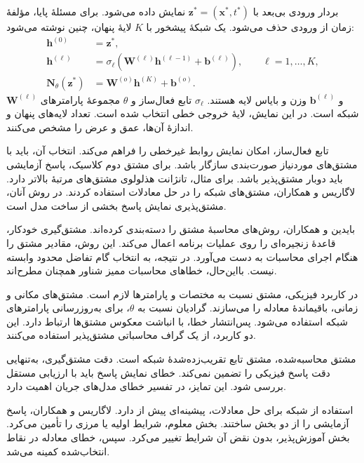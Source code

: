 بردار ورودی بی‌بعد با $\mathbf z^*=(\mathbf x^*,t^*)$ نمایش داده می‌شود.
برای مسئلهٔ پایا، مؤلفهٔ زمان از ورودی حذف می‌شود.
یک شبکهٔ پیشخور با $K$ لایهٔ پنهان، چنین نوشته می‌شود:
\begin{equation}
\begin{aligned}
\mathbf h^{(0)}&=\mathbf z^*,\\
\mathbf h^{(\ell)}
&=\sigma_\ell\!\left(
\mathbf W^{(\ell)}\mathbf h^{(\ell-1)}+\mathbf b^{(\ell)}
\right),\qquad \ell=1,\ldots,K,\\
\mathbf N_\theta(\mathbf z^*)
&=\mathbf W^{(o)}\mathbf h^{(K)}+\mathbf b^{(o)}.
\end{aligned}
\label{eq:lit-feedforward-network}
\end{equation}
$\mathbf W^{(\ell)}$ و $\mathbf b^{(\ell)}$ وزن و بایاس لایه هستند.
$\sigma_\ell$ تابع فعال‌ساز و $\theta$ مجموعهٔ پارامترهای شبکه است.
در این نمایش، لایهٔ خروجی خطی انتخاب شده است.
تعداد لایه‌های پنهان و اندازهٔ آن‌ها، عمق و عرض را مشخص می‌کنند.
\cite{Goodfellow2016}

تابع فعال‌ساز، امکان نمایش روابط غیرخطی را فراهم می‌کند.
انتخاب آن، باید با مشتق‌های موردنیاز صورت‌بندی سازگار باشد.
برای مشتق دوم کلاسیک، پاسخ آزمایشی باید دوبار مشتق‌پذیر باشد.
برای مثال، تانژانت هذلولوی مشتق‌های مرتبهٔ بالاتر دارد.
لاگاریس و همکاران، مشتق‌های شبکه را در حل معادلات استفاده کردند.
در روش آنان، مشتق‌پذیری نمایش پاسخ بخشی از ساخت مدل است.
\cite{Lagaris1998}

بایدین و همکاران، روش‌های محاسبهٔ مشتق را دسته‌بندی کرده‌اند.
مشتق‌گیری خودکار، قاعدهٔ زنجیره‌ای را روی عملیات برنامه اعمال می‌کند.
این روش، مقادیر مشتق را هنگام اجرای محاسبات به دست می‌آورد.
در نتیجه، به انتخاب گام تفاضل محدود وابسته نیست.
بااین‌حال، خطاهای محاسبات ممیز شناور همچنان مطرح‌اند.
\cite{Baydin2018}

در کاربرد فیزیکی، مشتق نسبت به مختصات و پارامترها لازم است.
مشتق‌های مکانی و زمانی، باقیماندهٔ معادله را می‌سازند.
گرادیان نسبت به $\theta$، برای به‌روزرسانی پارامترهای شبکه استفاده می‌شود.
پس‌انتشار خطا، با انباشت معکوس مشتق‌ها ارتباط دارد.
این دو کاربرد، از یک گراف محاسباتی مشتق‌پذیر استفاده می‌کنند.
\cite{Baydin2018}

مشتق محاسبه‌شده، مشتق تابع تقریب‌زده‌شدهٔ شبکه است.
دقت مشتق‌گیری، به‌تنهایی دقت پاسخ فیزیکی را تضمین نمی‌کند.
خطای نمایش پاسخ باید با ارزیابی مستقل بررسی شود.
این تمایز، در تفسیر خطای مدل‌های جریان اهمیت دارد.

\label{sec:lit-pinn-principles}

استفاده از شبکه برای حل معادلات، پیشینه‌ای پیش از  دارد.
لاگاریس و همکاران، پاسخ آزمایشی را از دو بخش ساختند.
بخش معلوم، شرایط اولیه یا مرزی را تأمین می‌کرد.
بخش آموزش‌پذیر، بدون نقض آن شرایط تغییر می‌کرد.
سپس، خطای معادله در نقاط انتخاب‌شده کمینه می‌شد.
\cite{Lagaris1998}

